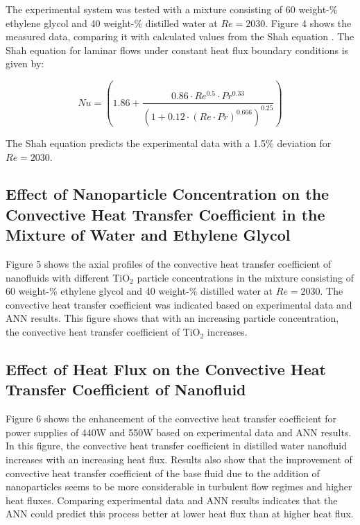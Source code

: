 \documentclass{article}
\begin{document}
The experimental system was tested with a mixture consisting of 60 weight-\% ethylene glycol and 40 weight-\% distilled water at $Re = 2030$. Figure 4 shows the measured data, comparing it with calculated values from the Shah equation \cite{ref10}. The Shah equation for laminar flows under constant heat flux boundary conditions is given by:

\begin{equation}
Nu = \left(1.86 + \frac{0.86 \cdot Re^{0.5} \cdot Pr^{0.33}}{\left(1 + 0.12 \cdot (Re \cdot Pr)^{0.666}\right)^{0.25}}\right)
\label{eq:shah}
\end{equation}

The Shah equation predicts the experimental data with a 1.5\% deviation for $Re = 2030$.

\subsection{Effect of Nanoparticle Concentration on the Convective Heat Transfer Coefficient in the Mixture of Water and Ethylene Glycol}

Figure 5 shows the axial profiles of the convective heat transfer coefficient of nanofluids with different TiO$_2$ particle concentrations in the mixture consisting of 60 weight-\% ethylene glycol and 40 weight-\% distilled water at $Re = 2030$. The convective heat transfer coefficient was indicated based on experimental data and ANN results. This figure shows that with an increasing particle concentration, the convective heat transfer coefficient of TiO$_2$ increases.

\subsection{Effect of Heat Flux on the Convective Heat Transfer Coefficient of Nanofluid}

Figure 6 shows the enhancement of the convective heat transfer coefficient for power supplies of 440W and 550W based on experimental data and ANN results. In this figure, the convective heat transfer coefficient in distilled water nanofluid increases with an increasing heat flux. Results also show that the improvement of convective heat transfer coefficient of the base fluid due to the addition of nanoparticles seems to be more considerable in turbulent flow regimes and higher heat fluxes. Comparing experimental data and ANN results indicates that the ANN could predict this process better at lower heat flux than at higher heat flux.
\end{document}
